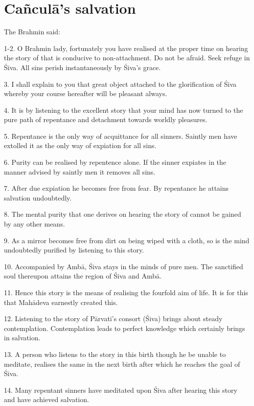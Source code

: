 \chapter{Cañculā’s salvation}

The Brahmin said:

1-2. O Brahmin lady, fortunately you have realised at the proper time on hearing
the story of  that is conducive to non-attachment. Do not be
afraid. Seek refuge in Śiva. All sins perish instantaneously by Śiva’s grace.

3. I shall explain to you that great object attached to the glorification of
Śiva whereby your course hereafter will be pleasant always.

4. It is by listening to the excellent story that your mind has now turned to
the pure path of repentance and detachment towards worldly pleasures.

5. Repentance is the only way of acquittance for all sinners. Saintly men have
extolled it as the only way of expiation for all sins.

6. Purity can be realised by repentence alone. If the sinner expiates in the
manner advised by saintly men it removes all sins.

7. After due expiation he becomes free from fear. By repentance he attains
salvation undoubtedly.

8. The mental purity that one derives on hearing the story of 
cannot be gained by any other means.

9. As a mirror becomes free from dirt on being wiped with a cloth, so is the
mind undoubtedly purified by listening to this story.

10. Accompanied by Ambā, Śiva stays in the minds of pure men. The sanctified
soul thereupon attains the region of Śiva and Ambā.

11. Hence this story is the means of realising the fourfold aim of life. It is
for this that Mahādeva earnestly created this.

12. Listening to the story of Pārvatī’s consort (Śiva) brings about steady
contemplation. Contemplation leads to perfect knowledge which certainly brings
in salvation.

13. A person who listens to the story in this birth though he be unable to
meditate, realises the same in the next birth after which he reaches the goal
of Śiva.

14. Many repentant sinners have meditated upon Śiva after hearing this story and
have achieved salvation.


